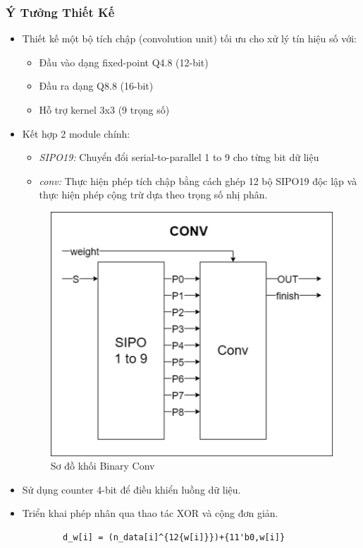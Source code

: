\subsubsection{Ý Tưởng Thiết Kế}
\begin{itemize}
    \item Thiết kế một bộ tích chập (convolution unit) tối ưu cho xử lý tín hiệu số với:
    \begin{itemize}
        \item Đầu vào dạng fixed-point Q4.8 (12-bit)
        \item Đầu ra dạng Q8.8 (16-bit)
        \item Hỗ trợ kernel 3x3 (9 trọng số)
    \end{itemize}
    \item Kết hợp 2 module chính:
    \begin{itemize}
        \item \textit{SIPO19:} Chuyển đổi serial-to-parallel 1 to 9 cho từng bit dữ liệu
        \item \textit{conv:} Thực hiện phép tích chập bằng cách ghép 12 bộ SIPO19 độc lập và thực hiện phép cộng trừ dựa theo trọng số nhị phân.
    \end{itemize}
    \begin{figure}[H]
        \centering
        \includegraphics[width=0.75\linewidth]{Images/conv.png}
        \caption{Sơ đồ khối Binary Conv}
        \label{fig:enter-label}
    \end{figure}
    \item Sử dụng counter 4-bit để điều khiển luồng dữ liệu.
    \item Triển khai phép nhân qua thao tác XOR và cộng đơn giản. 
    \begin{verbatim}
        d_w[i] = (n_data[i]^{12{w[i]}})+{11'b0,w[i]}
    \end{verbatim}
\end{itemize}


